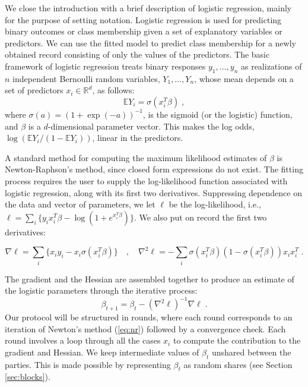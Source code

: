 \documentclass[11pt]{article}
\begin{document}
We close the introduction with a brief description of logistic regression, mainly for the purpose of setting notation.
Logistic regression is used for predicting binary outcomes or class membership given a set of explanatory variables or predictors. We can use the fitted model  to predict class membership for a newly obtained record consisting of only the values of  the predictors. The basic framework of logistic regression treats binary responses $y_1, \ldots, y_n$ as realizations of $n$ independent Bernoulli random variables, $Y_1, \ldots, Y_n$, whose mean depends on a set of predictors $x_i\in\mathbb{R}^d$, as follows:
\begin{equation}
\mathbb{E}Y_i = \sigma( x_i^T\beta) \; ,
\end{equation}
where $\sigma(a) = (1+\exp(-a))^{-1}$, is the sigmoid (or the logistic) function, and $\beta$ is a $d$-dimensional parameter vector. This makes the log odds, $\log(\mathbb{E}Y_i/(1-\mathbb{E}Y_i))$, linear in the predictors.

A standard method for computing the maximum likelihood estimates of $\beta$ is Newton-Raphson's  method, since closed form expressions do not exist. The fitting process  requires the user to supply the log-likelihood function associated with logistic regression, along with its first two derivatives.  Suppressing dependence on the data and vector of parameters, we let $\ell$ be the  log-likelihood, i.e., $\ell=\sum_i\{y_ix_i^T\beta - \log(1+e^{x_i^T\beta})\}$. We also put on record the first two derivatives:



\begin{equation}\label{grad-hess}
\nabla\ell = \sum_i\{x_i y_i - x_i \sigma(x_i^T\beta)\} \quad ,\quad
\nabla^2 \ell = -\sum_i{\sigma(x_i^T\beta)(1-\sigma(x_i^T\beta))x_ix_i^T} \; .
\end{equation}



The gradient and the Hessian are assembled together to produce an estimate of the logistic parameters through the iterative process:  
\begin{equation}\label{eq:nr}
\beta_{t+1}=\beta_t - (\nabla^2 \ell)^{-1} \nabla \ell \; .
\end{equation}
Our protocol will be structured in rounds, where each round corresponds to an iteration of Newton's method (\ref{eq:nr}) followed by a convergence check.  Each round involves a loop through all the cases $x_i$ to compute the contribution to the gradient and Hessian.  
We keep intermediate values of $\beta_t$ unshared between the parties. This is made possible by representing $\beta_t$ as random shares (see Section \ref{sec:blocks}).
\end{document}
